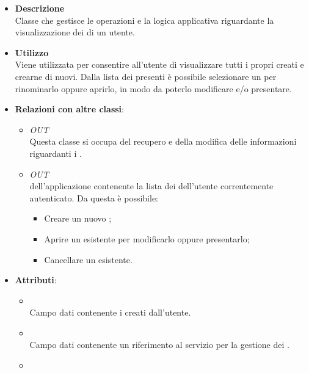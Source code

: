 \begin{itemize}
\item \textbf{Descrizione}\\
Classe che gestisce le operazioni e la logica applicativa riguardante la visualizzazione dei  di un utente.
\item \textbf{Utilizzo}\\
Viene utilizzata per consentire all’utente di visualizzare tutti i propri  creati e crearne di nuovi. Dalla lista dei  presenti è possibile selezionare un  per rinominarlo oppure aprirlo, in modo da poterlo modificare e/o presentare.
\item \textbf{Relazioni con altre classi}:
\begin{itemize}
\item \textit{OUT} \hyperref[\nogloxy{Premi::Front-End::Services::ProjectService}]{}\\
Questa classe si occupa del recupero e della modifica delle informazioni riguardanti i .
\item \textit{OUT} \hyperref[\nogloxy{Premi::Front-End::Views::DashboardView}]{}\\
 dell’applicazione contenente la lista dei  dell’utente correntemente autenticato.
Da questa  è possibile:
\begin{itemize}
\item Creare un nuovo ;
\item Aprire un  esistente per modificarlo oppure presentarlo;
\item Cancellare un  esistente.
\end{itemize}
\end{itemize}
\item \textbf{Attributi}:
\begin{itemize}
\item {}
\\ Campo dati contenente i  creati dall'utente.
\item {}
\\ Campo dati contenente un riferimento al servizio per la gestione dei .
\item {}
\\ \dpLocationField

\end{itemize}
\end{itemize}
